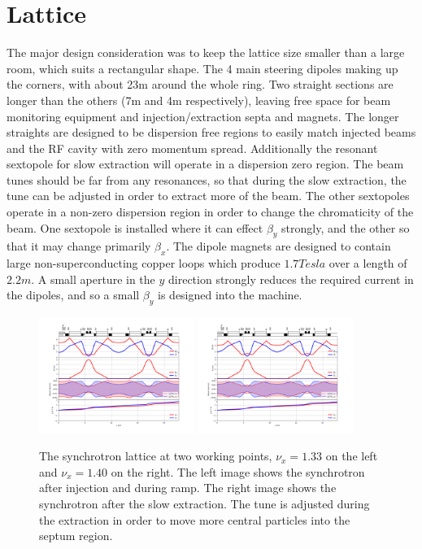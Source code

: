 \section{Lattice}
The major design consideration was to keep the lattice size smaller than a large room, which suits a rectangular shape.  The 4 main steering dipoles making up the
corners, with about 23m around the whole ring.  Two straight sections are longer than the others (7m and 4m respectively), leaving free space for beam 
monitoring equipment and injection/extraction septa and magnets.  The longer straights are designed to be dispersion free regions to easily match injected beams
and the RF cavity with zero momentum spread.  Additionally the resonant sextopole for slow extraction will operate in a dispersion zero region.
The beam tunes should be far from any resonances, so that during the slow extraction, the tune can be adjusted in order to extract more of the beam.
The other sextopoles operate in a non-zero dispersion region in order to change the chromaticity of the beam.  One sextopole is installed where it can effect
$\beta_y$ strongly, and the other so that it may change primarily $\beta_x$.  The dipole magnets are designed to contain large non-superconducting copper loops
which produce $1.7 Tesla$ over a length of $2.2 m$. A small aperture in the $y$ direction strongly reduces the required current in the dipoles, and so a small 
$\beta_y$ is designed into the machine.  
\begin{figure}[h] 
  \begin{center}
    \includegraphics[width=0.45\textwidth]{twiss_33.png}
    \includegraphics[width=0.45\textwidth]{twiss_40.png}
    \caption{The synchrotron lattice at two working points, $\nu_x = 1.33$ on the left and $\nu_x = 1.40$ on the right. 
      The left image shows the synchrotron after injection and during ramp.  The right
      image shows the synchrotron after the slow extraction.  The tune is adjusted during the extraction in order to move more central particles into
    the septum region. }

  \end{center}
  \label{fig:lat}
\end{figure}

